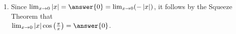 \documentclass{ximera}
\begin{document}
\begin{exercise}
\begin{exercise}
\begin{exercise}
\begin{exercise}
\begin{enumerate}
\item Since $\lim_{x\to0}\left|x\right| = \answer{0} = \lim_{x\to0}(-\left|x\right|)$, it follows by the Squeeze Theorem that\\[1em]  $\lim_{x\to0}\left|x\right|\cos\left(\frac{\pi}{x}\right)=\answer{0}$.
\end{enumerate}
\end{exercise}
\end{exercise}
\end{exercise}
\end{exercise}
\end{document}
